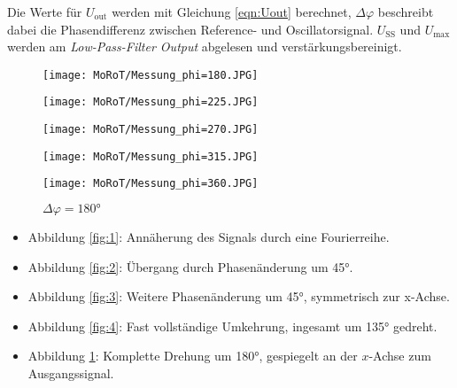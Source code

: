 Die Werte für $U_\text{out}$ werden mit Gleichung \eqref{eqn:Uout} berechnet, $\Delta\varphi$ beschreibt dabei die Phasendifferenz zwischen
Reference- und Oscillatorsignal. $U_\text{SS}$ und $U_\text{max}$ werden am \emph{Low-Pass-Filter Output} abgelesen und
verstärkungsbereinigt.
\begin{figure}[!h]
\begin{minipage}[t]{0.3\textwidth}
\texttt{[image: MoRoT/Messung\_phi=180.JPG]}
\label{fig:1}
\caption{$\Delta\varphi = 0\si{\degree}$}
\end{minipage}
\hspace{10pt}
\vspace{5pt}
\begin{minipage}[t]{0.3\textwidth}
\texttt{[image: MoRoT/Messung\_phi=225.JPG]}
\label{fig:2}
\caption{$\Delta\varphi = 45\si{\degree}$}
\end{minipage}
\hspace{10pt}
\vspace{5pt}
\begin{minipage}[t]{0.3\textwidth}
\texttt{[image: MoRoT/Messung\_phi=270.JPG]}
\label{fig:3}
\caption{$\Delta\varphi = 90\si{\degree}$}
\end{minipage}
\hspace{10pt}
\vspace{5pt}
\begin{minipage}[t]{0.3\textwidth}
\texttt{[image: MoRoT/Messung\_phi=315.JPG]}
\label{fig:4}
\caption{$\Delta\varphi = 135\si{\degree}$}
\end{minipage}
\hspace{12pt}
\vspace{5pt}
\begin{minipage}[t]{0.3\textwidth}
\texttt{[image: MoRoT/Messung\_phi=360.JPG]}
\label{fig:5}
\caption{$\Delta\varphi = 180\si{\degree}$}
\end{minipage}
\hspace{12pt}
\vspace{5pt}
\end{figure}

\begin{itemize}
  \item Abbildung \ref{fig:1}: Annäherung des Signals durch eine Fourierreihe.
  \item Abbildung \ref{fig:2}: Übergang durch Phasenänderung um 45\si{\degree}.
  \item Abbildung \ref{fig:3}: Weitere Phasenänderung um 45\si{\degree}, symmetrisch zur x-Achse.
  \item Abbildung \ref{fig:4}: Fast vollständige Umkehrung, ingesamt um 135\si{\degree} gedreht.
  \item Abbildung \ref{fig:5}: Komplette Drehung um 180\si{\degree}, gespiegelt an der $x$-Achse zum Ausgangssignal.
\end{itemize}

